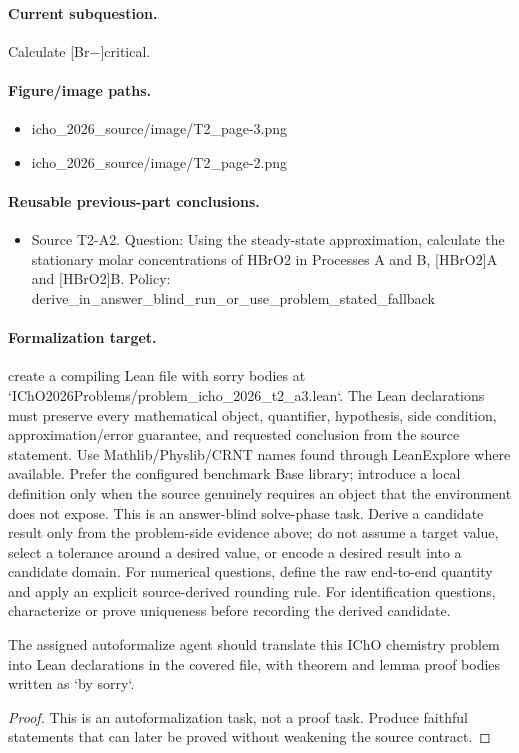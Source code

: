 \paragraph{Current subquestion.}
Calculate [Br−]critical.

\paragraph{Figure/image paths.}
\begin{itemize}
\item icho\_2026\_source/image/T2\_page-3.png
\item icho\_2026\_source/image/T2\_page-2.png
\end{itemize}

\paragraph{Reusable previous-part conclusions.}
\begin{itemize}
\item Source T2-A2. Question: Using the steady-state approximation, calculate the stationary molar concentrations of HBrO2 in Processes A and B, [HBrO2]A and [HBrO2]B. Policy: derive\_in\_answer\_blind\_run\_or\_use\_problem\_stated\_fallback
\end{itemize}

\paragraph{Formalization target.}
create a compiling Lean file with sorry bodies at `IChO2026Problems/problem\_icho\_2026\_t2\_a3.lean`.
The Lean declarations must preserve every mathematical object, quantifier, hypothesis, side condition, approximation/error guarantee, and requested conclusion from the source statement.
Use Mathlib/Physlib/CRNT names found through LeanExplore where available. Prefer the configured benchmark Base library; introduce a local definition only when the source genuinely requires an object that the environment does not expose.
This is an answer-blind solve-phase task. Derive a candidate result only from the problem-side evidence above; do not assume a target value, select a tolerance around a desired value, or encode a desired result into a candidate domain.
For numerical questions, define the raw end-to-end quantity and apply an explicit source-derived rounding rule. For identification questions, characterize or prove uniqueness before recording the derived candidate.

\begin{theorem}
\label{thm:physics:icho_2026_t2_a3:target}
The assigned autoformalize agent should translate this IChO chemistry problem into Lean declarations in the covered file, with theorem and lemma proof bodies written as `by sorry`.
\end{theorem}
\begin{proof}
This is an autoformalization task, not a proof task. Produce faithful statements that can later be proved without weakening the source contract.
\end{proof}

